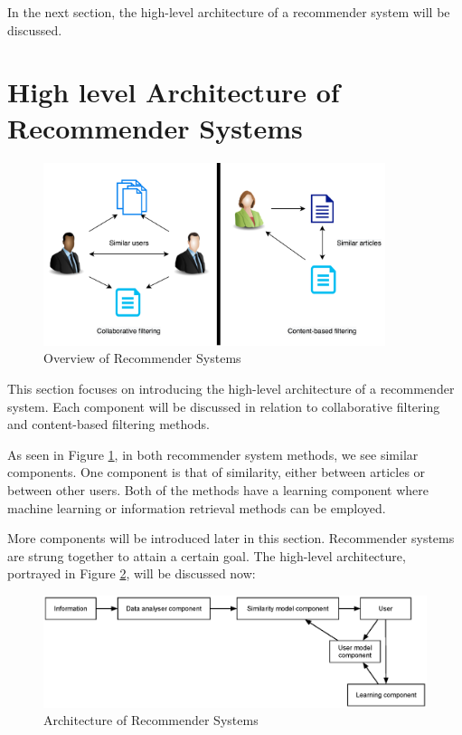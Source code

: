 In the next section, the high-level architecture of a recommender system will be discussed.

\section{High level Architecture of Recommender Systems}

\begin{figure}[htbp]
\centering
\includegraphics[width=10cm]{./figures/overviewRS1.png}
\caption{Overview of Recommender Systems}
\label{fig:OverviewRS}
\end{figure}

This section focuses on introducing the high-level architecture of a recommender system. Each component will be discussed in relation to collaborative filtering and content-based filtering methods.

As seen in Figure \ref{fig:OverviewRS}, in both recommender system methods, we see similar components. One component is that of similarity, either between articles or between other users. Both of the methods have a learning component where machine learning or information retrieval methods can be employed.

More components will be introduced later in this section. Recommender systems are strung together to attain a certain goal. The high-level architecture, portrayed in Figure \ref{fig:archRS}, will be discussed now:

\begin{figure}[htbp]
\centering
\includegraphics[width=12cm]{./figures/arch12.eps}
\caption{Architecture of Recommender Systems}
\label{fig:archRS}
\end{figure}


